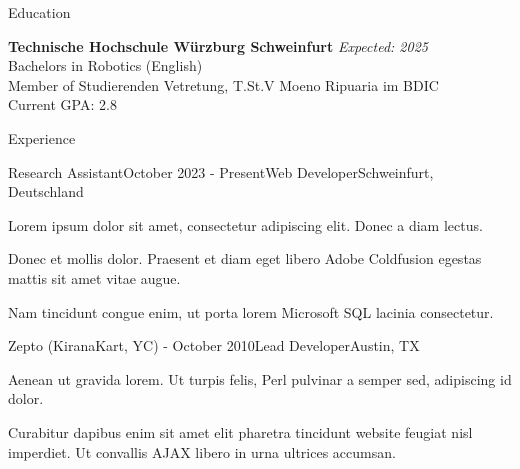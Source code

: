 \documentclass[
	a4paper, %
	11pt, %
]{resume} %
\begin{document}

\begin{rSection}{Education}

	\textbf{Technische Hochschule Würzburg Schweinfurt} \hfill \textit{Expected: 2025} \\
	Bachelors in Robotics (English) \\
	Member of Studierenden Vetretung, T.St.V Moeno Ripuaria im BDIC \\
	Current GPA: 2.8

\end{rSection}


\begin{rSection}{Experience}

	\begin{rSubsection}{Research Assistant}{October 2023 - Present}{Web Developer}{Schweinfurt, Deutschland}
		\item Lorem ipsum dolor sit amet, consectetur adipiscing elit. Donec a diam lectus.
		\item Donec et mollis dolor. Praesent et diam eget libero Adobe Coldfusion egestas mattis sit amet vitae augue.
		\item Nam tincidunt congue enim, ut porta lorem Microsoft SQL lacinia consectetur.
	\end{rSubsection}


	\begin{rSubsection}{Zepto (KiranaKart, YC)}{ - October 2010}{Lead Developer}{Austin, TX}
		\item Aenean ut gravida lorem. Ut turpis felis, Perl pulvinar a semper sed, adipiscing id dolor.
		\item Curabitur dapibus enim sit amet elit pharetra tincidunt website feugiat nisl imperdiet. Ut convallis AJAX libero in urna ultrices accumsan.
	\end{rSubsection}

\end{rSection}

\end{document}
